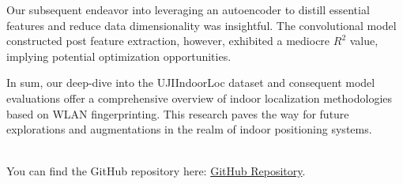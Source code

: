 \documentclass[conference]{IEEEtran}
\begin{document}
Our subsequent endeavor into leveraging an autoencoder to distill essential features and reduce data dimensionality was insightful. The convolutional model constructed post feature extraction, however, exhibited a mediocre \( R^2 \) value, implying potential optimization opportunities.

In sum, our deep-dive into the UJIIndoorLoc dataset and consequent model evaluations offer a comprehensive overview of indoor localization methodologies based on WLAN fingerprinting. This research paves the way for future explorations and augmentations in the realm of indoor positioning systems.


\\

You can find the GitHub repository here: \href{https://github.com/ccamachosa31/IAProyectoDL}{GitHub Repository}.



 	

\vspace{12pt}
\end{document}
